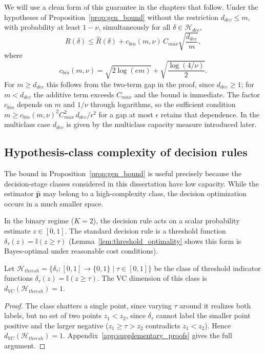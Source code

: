 We will use a clean form of this guarantee in the chapters that follow. Under the hypotheses of Proposition~\ref{prop:gen_bound} without the restriction $d_{dec} \leq m$, with probability at least $1-\nu$, simultaneously for all $\delta \in \mathcal{H}_{dec}$,
\begin{equation}\label{eq:clean_gen_bound}
    R(\delta) \leq \hat{R}(\delta) + c_{bin}(m,\nu)\, C_{max} \sqrt{\frac{d_{dec}}{m}},
\end{equation}
where
\begin{equation*}
    c_{bin}(m,\nu)=\sqrt{2\log(em)}+\sqrt{\frac{\log(4/\nu)}{2}}.
\end{equation*}
For $m \geq d_{dec}$ this follows from the two-term gap in the proof, since $d_{dec} \geq 1$; for $m < d_{dec}$ the additive term exceeds $C_{max}$ and the bound is immediate. The factor $c_{bin}$ depends on $m$ and $1/\nu$ through logarithms, so the sufficient condition $m \geq c_{bin}(m,\nu)^2 C_{max}^2\, d_{dec}/\epsilon^2$ for a gap at most $\epsilon$ retains that dependence. In the multiclass case $d_{dec}$ is given by the multiclass capacity measure introduced later.

\subsection{Hypothesis-class complexity of decision rules}

The bound in Proposition~\ref{prop:gen_bound} is useful precisely because the decision-stage classes considered in this dissertation have low capacity. While the estimator $\hat{\mathbf{p}}$ may belong to a high-complexity class, the decision optimization occurs in a much smaller space.

In the binary regime ($K=2$), the decision rule acts on a scalar probability estimate $z \in [0, 1]$. The standard decision rule is a threshold function $\delta_\tau(z) = \mathbb{I}(z \geq \tau)$ (Lemma~\ref{lem:threshold_optimality} shows this form is Bayes-optimal under reasonable cost conditions).

\begin{lemma}\label{lem:vc_thresh}
Let $\mathcal{H}_{thresh} = \{ \delta_\tau : [0,1] \to \{0,1\} \mid \tau \in [0,1] \}$ be the class of threshold indicator functions $\delta_\tau(z) = \mathbb{I}(z \geq \tau)$. The VC dimension of this class is $d_{VC}(\mathcal{H}_{thresh}) = 1$.
\end{lemma}

\begin{proof}
The class shatters a single point, since varying $\tau$ around it realizes both labels, but no set of two points $z_1 < z_2$, since $\delta_\tau$ cannot label the smaller point positive and the larger negative ($z_1 \geq \tau > z_2$ contradicts $z_1 < z_2$). Hence $d_{VC}(\mathcal{H}_{thresh}) = 1$. Appendix~\ref{app:supplementary_proofs} gives the full argument.
\end{proof}

